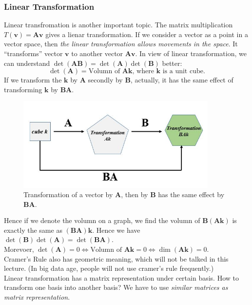 \subsubsection{Linear Transformation}
Linear transfromation is another important topic. The matrix multiplication $T(\bm v)=\bm{Av}$ gives a lienar transformation. If we consider a vector as a point in a vector space, then \textit{the linear transformation allows movements in the space}. It ``transforms'' vector $\bm v$ to another vector $\bm{Av}$. In view of linear transformation, we can understand $\det(\bm{AB})=\det(\bm A)\det(\bm B)$ better:
\[
\det(\bm A)=\text{Volumn of $\bm{Ak}$, where $\bm k$ is a unit cube.}
\]
If we transform the $\bm k$ by $\bm A$ secondly by $\bm B$, actually, it has the same effect of transforming $\bm k$ by $\bm{BA}$.
\begin{figure}[H]
\centering
\includegraphics[width=10cm]{week6/determinant}
\caption{Transformation of a vector by $\bm A$, then by $\bm B$ has the same effect by $\bm{BA}$.}
\end{figure}
Hence if we denote the volumn on a graph, we find the volumn of $\bm B(\bm{Ak})$ is exactly the same as $(\bm{BA})\bm k$. Hence we have $\det(\bm B)\det(\bm A)=\det(\bm{BA})$.\\
Morevoer, $\det(\bm A)=0\Longleftrightarrow
\text{Volumn of $\bm{Ak}=0$}\Longleftrightarrow
\dim(\bm{Ak})=0.$\\
Cramer's Rule also has geometric meaning, which will not be talked in this lecture. (In big data age, people will not use cramer's rule frequently.)\\
Linear transformation has a matrix representation under certain basis. How to transform one basis into another basis? We have to use \textit{similar matrices as matrix representation}.
